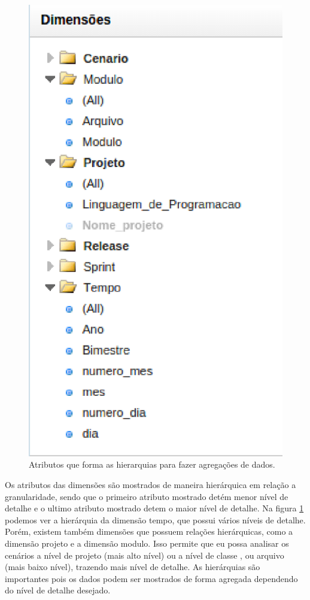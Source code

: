 \begin{figure}[H]
	\centering
	\includegraphics[scale=0.6]{figuras/dw-hierarquias}
	\caption{Atributos que forma as hierarquias para fazer agregações de dados.}
	\label{dw-hierarquias}
\end{figure}

Os atributos das dimensões são mostrados de maneira hierárquica em relação a granularidade, sendo que o primeiro atributo mostrado detém menor nível de detalhe e o ultimo atributo mostrado detem o maior nível de detalhe. Na figura \ref{dw-hierarquias} podemos ver a hierárquia da dimensão tempo, que possui vários níveis de detalhe. Porém, existem também dimensões que possuem relações hierárquicas, como a dimensão projeto e a dimensão modulo. Isso permite que eu possa analisar os cenários a nível de projeto (mais alto nível) ou a nível de classe , ou arquivo (mais baixo nível), trazendo mais nível de detalhe. As hierárquias são importantes pois os dados podem ser mostrados de forma agregada dependendo do nível de detalhe desejado.


